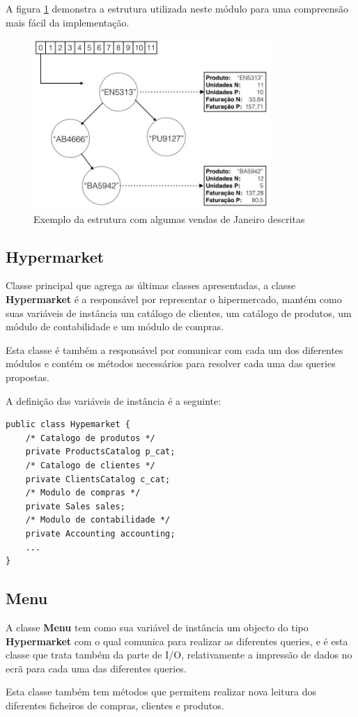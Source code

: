 \documentclass[10pt] {article}
\begin{document}
\par A figura \ref{fig:accounting} demonstra a estrutura utilizada neste módulo para uma compreensão mais fácil da implementação.

\begin{figure}[ht!]
\centering
\includegraphics[width=90mm]{accounting.jpg}
\caption{Exemplo da estrutura com algumas vendas de Janeiro descritas}
\label{fig:accounting}
\end{figure}

\subsection{Hypermarket}
\par Classe principal que agrega as últimas classes apresentadas, a classe \color{blue} \textbf{Hypermarket} \color{black}
é a responsável por representar o hipermercado, mantém como suas variáveis de instância um catálogo de clientes,
um catálogo de produtos, um módulo de contabilidade e um módulo de compras.
\par Esta classe é também a responsável por comunicar com cada um dos diferentes módulos e contém os métodos
necessários para resolver cada uma das queries propostas.
\par A definição das variáveis de instância é a seguinte:

\begin{lstlisting}
public class Hypemarket {
	/* Catalogo de produtos */
	private ProductsCatalog p_cat;
	/* Catalogo de clientes */
	private ClientsCatalog c_cat;
	/* Modulo de compras */
	private Sales sales;
	/* Modulo de contabilidade */
	private Accounting accounting;
	...
}
\end{lstlisting}

\subsection{Menu}
\par A classe \color{blue} \textbf{Menu} \color{black} tem como sua variável de instância um objecto do tipo
\color{blue} \textbf{Hypermarket} \color{black} com o qual comunica para realizar as diferentes queries, e é esta classe que trata
também da parte de I/O, relativamente a impressão de dados no ecrã para cada uma das diferentes queries.
\par Esta classe também tem métodos que permitem realizar nova leitura dos diferentes ficheiros de compras, clientes e
produtos.
\end{document}
